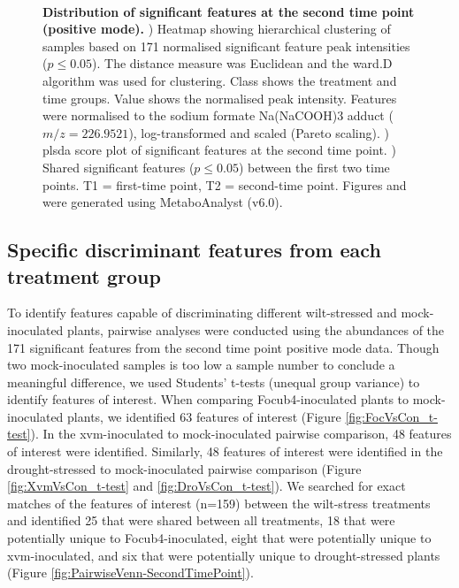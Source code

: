 \begin{figure}[!hptb]
\begin{minipage}[b]{0.57\textwidth}
\begin{subfigure}[b]{\linewidth}
        \caption{}
        \label{fig:FeaturesTimePoint_Venn}
      \end{subfigure}\\[\baselineskip]
    \end{minipage}
    \caption[Distribution of features at the second time point (positive mode).]{\textbf{Distribution of significant features at the second time point (positive mode).}
    \textbf{}) Heatmap showing hierarchical clustering of samples based on 171 normalised significant feature peak intensities ($p \le0.05$). The distance measure was Euclidean and the ward.D algorithm was used for clustering. Class shows the treatment and time groups. Value shows the normalised peak intensity. Features were normalised to the sodium formate Na(NaCOOH)3 adduct ($m/z=226.9521$), log-transformed and scaled (Pareto scaling). 
    \textbf{}) \acl{plsda} score plot of significant features at the second time point. 
    \textbf{}) Shared significant features ($p \le0.05$) between the first two time points. T1 = first-time point, T2 = second-time point.
    Figures  and  were generated using MetaboAnalyst (v6.0). 
    }
    \label{fig:SecondTimePointSigFig}
\end{figure}

\subsection{Specific discriminant features from each treatment group }

To identify features capable of discriminating different wilt-stressed and mock-inoculated plants, pairwise analyses were conducted using the abundances of the 171 significant features from the second time point positive mode data. Though two mock-inoculated samples is too low a sample number to conclude a meaningful difference, we used  Students' t-tests (unequal group variance) to identify features of interest. When comparing \ac{Focub4}-inoculated plants to mock-inoculated plants, we identified 63 features of interest (Figure  \ref{fig:FocVsCon_t-test}). In the \ac{xvm}-inoculated to mock-inoculated pairwise comparison, 48 features of interest were identified. Similarly, 48 features of interest were identified in the drought-stressed to mock-inoculated pairwise comparison (Figure  \ref{fig:XvmVsCon_t-test} and \ref{fig:DroVsCon_t-test}). We searched for exact matches of the features of interest (n=159) between the wilt-stress treatments and identified 25 that were shared between all treatments, 18 that were potentially unique to \ac{Focub4}-inoculated, eight that were potentially unique to \ac{xvm}-inoculated, and six that were potentially unique to drought-stressed plants (Figure  \ref{fig:PairwiseVenn-SecondTimePoint}).

